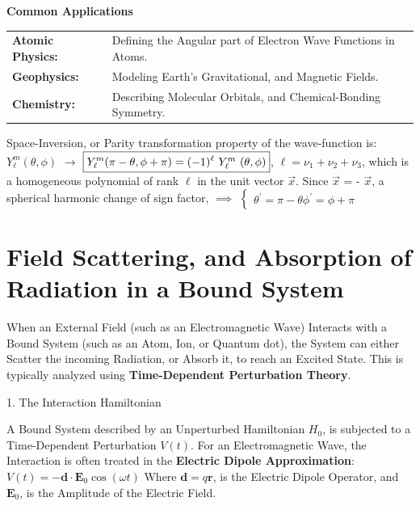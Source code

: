 \documentclass[a4paper, 10pt, onepage]{elegantbook}
\begin{document}
{\newpage

    \noindent\textbf{Common Applications}

\begin{tabularx}{\linewidth}{
  @{}>{\bfseries}l @{\quad} X@{}
}
Atomic Physics: & Defining the Angular part of Electron Wave Functions in Atoms. \\
Geophysics:     & Modeling Earth's Gravitational, and Magnetic Fields. \\
Chemistry:      & Describing Molecular Orbitals, and Chemical-Bonding Symmetry. \\
\end{tabularx}

\medskip

Space-Inversion, or Parity transformation property of the wave-function is:
$Y^m_\ell (\theta, \phi)$ $\rightarrow$ $\boxed{Y^m_\ell(\pi - \theta, \phi + \pi) = (-1)^{\ell}$ $Y^m_\ell$ $(\theta, 
\phi)}$, $\boxed{\ell = \nu_1 + \nu_2 + \nu_3}$, which is a homogeneous polynomial of rank $\ell$ in the unit vector 
$\vec{x}$.
Since $\vec{x}$ = - $\vec{x}$, a spherical harmonic change of sign factor,
$\implies$
$\left\{
\begin{array}{ll}
   \theta^{'} = \pi - \theta  
   \phi^{'}   = \phi + \pi  
\end{array}
\right.$

\newpage

\chapter{Field Scattering, and Absorption of Radiation in a Bound System}

When an External Field (such as an Electromagnetic Wave) Interacts with a Bound System (such as an Atom, Ion, or 
Quantum dot), the System can either Scatter the incoming Radiation, or Absorb it, to reach an Excited State. This is 
typically analyzed using \textbf{Time-Dependent Perturbation Theory}.

    1. The Interaction Hamiltonian

\noindent

A Bound System described by an Unperturbed Hamiltonian $H_0$, is subjected to a Time-Dependent Perturbation $V(t)$.
For an Electromagnetic Wave, the Interaction is often treated in the \textbf{Electric Dipole Approximation}:
$ V(t) = -\mathbf{d} \cdot \mathbf{E}_0 \cos(\omega t) $
Where $\mathbf{d} = q\mathbf{r}$, is the Electric Dipole Operator, and $\mathbf{E}_0$, is the Amplitude of the Electric 
Field.

}
\end{document}
